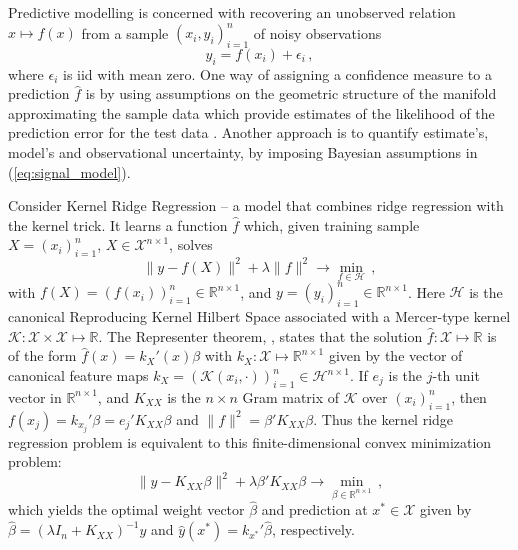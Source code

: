 \documentclass[10pt, conference, compsocconf]{IEEEtran}
\newcommand{\Hcal}{\mathcal{H}}
\newcommand{\Kcal}{\mathcal{K}}
\newcommand{\Xcal}{\mathcal{X}}
\newcommand{\Real}{\mathbb{R}}
\begin{document}
Predictive modelling is concerned with recovering an unobserved relation $x\mapsto f(x)$
from a sample $(x_i, y_i)_{i=1}^n$ of noisy observations
\begin{equation} \label{eq:signal_model}
  y_i = f(x_i) + \epsilon_i \,,
\end{equation}
where $\epsilon_i$ is iid with mean zero. One way of assigning a confidence measure
to a prediction $\hat{f}$ is by using assumptions on the geometric structure of the
manifold approximating the sample data which provide estimates of the likelihood of
the prediction error for the test data \cite{Bernstein2015,Kuleshov2016}. Another
approach is to quantify estimate's, model's and observational uncertainty, by imposing
Bayesian assumptions in (\ref{eq:signal_model}).

Consider Kernel Ridge Regression -- a model that combines ridge regression with the
kernel trick. It learns a function $\hat{f}$ which, given training sample $X = (x_i)_{i=1}^n$,
$X\in \Xcal^{n\times 1}$, solves
\begin{equation*}
  \|y - f(X)\|^2 + \lambda \|f\|^2 \to \min_{f \in \Hcal} \,,
\end{equation*}
with $f(X) = (f(x_i))_{i=1}^n \in \Real^{n\times 1}$, and $y=(y_i)_{i=1}^n \in \Real^{n\times 1}$.
Here $\Hcal$ is the canonical Reproducing Kernel Hilbert Space associated with
a Mercer-type kernel $\Kcal:\Xcal\times \Xcal\mapsto \Real$. The Representer theorem,
\cite{scholkopf2002}, states that the solution $\hat{f}:\Xcal\mapsto\Real$ is of the
form $\hat{f}(x) = k_X'(x) \beta$ with $k_X: \Xcal\mapsto \Real^{n\times 1}$ given by the 
vector of canonical feature maps $k_X = (\Kcal(x_i, \cdot))_{i=1}^n \in \Hcal^{n\times 1}$.
If $e_j$ is the $j$-th unit vector in $\Real^{n\times 1}$, and $K_{XX}$ is the $n\times n$
Gram matrix of $\Kcal$ over $(x_i)_{i=1}^n$, then $f(x_j) = k_{x_j}' \beta = e_j' K_{XX} \beta$
and  $\| f \|^2 = \beta' K_{XX} \beta$. Thus the kernel ridge regression problem is
equivalent to this finite-dimensional convex minimization problem:
\begin{equation*}
  \|y - K_{XX} \beta \|^2 + \lambda \beta' K_{XX} \beta
    \to \min_{\beta\in \Real^{n\times 1}} \,,
\end{equation*}
which yields the optimal weight vector $\hat{\beta}$ and prediction at $x^*\in \Xcal$
given by $\hat{\beta} = (\lambda I_n + K_{XX})^{-1} y$ and $\hat{y}(x^*) = k_{x^*}'\hat{\beta}$,
respectively.
\end{document}
